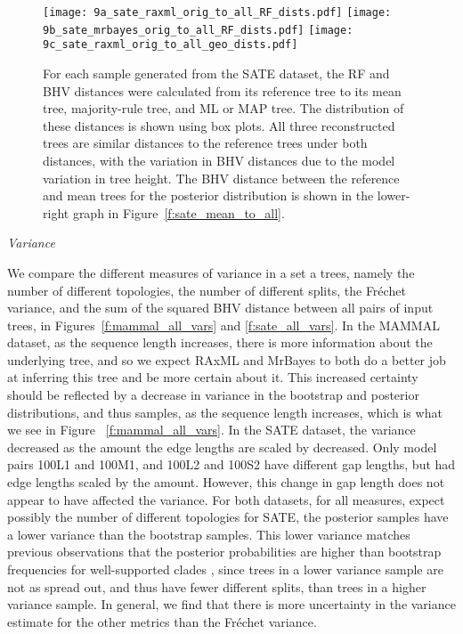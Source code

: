 \documentclass[12pt,letterpaper]{article}
\theoremstyle{plain}
\theoremstyle{definition}
\renewcommand{\subsection}[1]{%
\bigskip
\begin{center}
\begin{large}
\normalfont\itshape #1
\end{large}
\end{center}}
\begin{document}
\begin{figure}[!htb]
\centering
\texttt{[image: 9a\_sate\_raxml\_orig\_to\_all\_RF\_dists.pdf]}
\texttt{[image: 9b\_sate\_mrbayes\_orig\_to\_all\_RF\_dists.pdf]}
\texttt{[image: 9c\_sate\_raxml\_orig\_to\_all\_geo\_dists.pdf]} 


\caption{For each sample generated from the SATE dataset, the RF and BHV distances were calculated from its reference tree to its mean tree, majority-rule tree, and ML or MAP tree. The distribution of these distances is shown using box plots. All three reconstructed trees are similar distances to the reference trees under both distances, with the variation in BHV distances due to the model variation in tree height. The BHV distance between the reference and mean trees for the posterior distribution is shown in the lower-right graph in Figure~\ref{f:sate_mean_to_all}.}
\centering
\label{f:sate_orig_to_all}
\end{figure}

\subsection{Variance}
We compare the different measures of variance in a set a trees, namely the number of different topologies, the number of different splits, the Fr\'echet variance, and the sum of the 
squared BHV distance between all pairs of input trees, in Figures~\ref{f:mammal_all_vars} and \ref{f:sate_all_vars}.  In the MAMMAL dataset, as the sequence length increases, there
 is more information about the underlying tree, and so we expect RAxML and MrBayes to both do a better job at inferring this tree and be more certain about it.  This increased certainty 
 should be reflected by a decrease in variance in the bootstrap and posterior distributions, and thus samples, as the sequence length increases, which is what we see in Figure~
 \ref{f:mammal_all_vars}.  In the SATE dataset, the variance decreased as the amount the edge lengths are scaled by decreased.  Only model pairs 100L1 and 100M1, and 100L2 and 
 100S2 have different gap lengths, but had edge lengths scaled by the amount.  However, this change in gap length does not appear to have affected the variance. For both datasets, 
 for all measures, expect possibly the number of different topologies for SATE, the posterior samples have a lower variance than the bootstrap samples. This lower variance matches 
 previous observations that the posterior probabilities are higher than bootstrap frequencies for well-supported clades 
 \citep{erixon2003reliability,douady2003comparison,huelsenbeck2004frequentist}, since trees in a lower variance sample are not as spread out, and thus have fewer different splits, 
 than trees in a higher variance sample.  In general, we find that there is more uncertainty in the variance estimate for the other metrics than the Fr\'echet variance.
\end{document}

